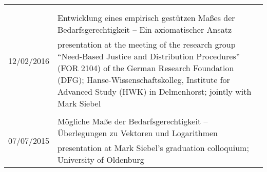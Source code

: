 \documentclass[a4paper,10pt]{article}
\begin{document}
\begin{longtable}{p{2.5cm}p{11cm}}
\\
\\ %
\\ %
\multirow{2}{2.5cm}{\footnotesize{12/02/2016}} & Entwicklung eines empirisch gestützen Maßes der Bedarfsgerechtigkeit -- Ein axiomatischer Ansatz\\
& \footnotesize{presentation at the meeting of the research group \enquote{Need-Based Justice and Distribution Procedures} (FOR 2104) of the German Research Foundation (DFG); Hanse-Wissenschaftskolleg, Institute for Advanced Study (HWK) in Delmenhorst; jointly with Mark Siebel}\\
\\
\multirow{2}{2.5cm}{\footnotesize{07/07/2015}} & Mögliche Maße der Bedarfsgerechtigkeit -- Überlegungen zu Vektoren und Logarithmen\\
& \footnotesize{presentation at Mark Siebel's graduation colloquium; University of Oldenburg}\\
\end{longtable}


\clearpage
\end{document}
